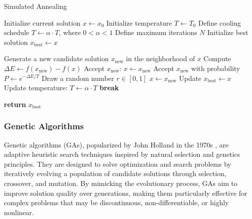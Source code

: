 \documentclass{article}[12pt]
\begin{document}
\begin{algorithm}[H]
\caption{Simulated Annealing}
\begin{algorithmic}[1]
\State Initialize current solution $x \gets x_0$
\State Initialize temperature $T \gets T_0$
\State Define cooling schedule $T \gets \alpha \cdot T$, where $0 < \alpha < 1$
\State Define maximum iterations $N$
\State Initialize best solution $x_\text{best} \gets x$

    \State Generate a new candidate solution $x_\text{new}$ in the neighborhood of $x$
    \State Compute $\Delta E \gets f(x_\text{new}) - f(x)$
        \State Accept $x_\text{new}$: $x \gets x_\text{new}$
    \Else
        \State Accept $x_\text{new}$ with probability $P \gets e^{-\Delta E / T}$
        \State Draw a random number $r \in [0, 1]$
            \State $x \gets x_\text{new}$
        \EndIf
    \EndIf
        \State Update $x_\text{best} \gets x$
    \EndIf
    \State Update temperature: $T \gets \alpha \cdot T$
        \State \textbf{break}
    \EndIf
\EndFor

\State \textbf{return} $x_\text{best}$
\end{algorithmic}
\end{algorithm}


\subsubsection*{Genetic Algorithms}
Genetic algorithms (GAs), popularized by John Holland in the 1970s \cite{Holland:1975aa}, are adaptive heuristic search techniques inspired by natural selection and genetics principles. 
They are designed to solve optimization and search problems by iteratively evolving a population of candidate solutions through selection, crossover, and mutation. 
By mimicking the evolutionary process, GAs aim to improve solution quality over generations, making them particularly effective for complex problems that may be discontinuous, non-differentiable, or highly nonlinear.
\end{document}
